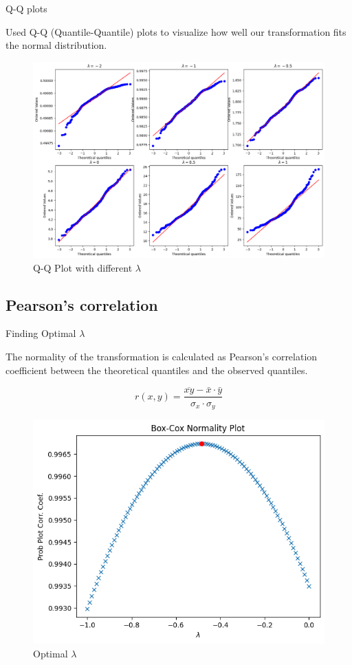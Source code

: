 \begin{frame}{Q-Q plots}

  Used Q-Q (Quantile-Quantile) plots to visualize how well our transformation fits the normal distribution.

  \vspace{0.25in}
  \begin{figure}
    \centering
    \includegraphics[width=0.8\linewidth]{../Report/images/q-q.png}
    \caption{Q-Q Plot with different $\lambda$}
  \end{figure}

\end{frame}


\subsection{Pearson's correlation}

\begin{frame}{Finding Optimal $\lambda$}

  The normality of the transformation is calculated as Pearson's correlation coefficient between the theoretical quantiles and the observed quantiles.

  \[ r(x, y) = \frac{\overline{xy} - \bar{x} \cdot \bar{y}}{\sigma_x \cdot \sigma_y} \]

  \vspace{0.25in}
  \begin{figure}
    \centering
    \includegraphics[width=0.6\linewidth]{../Report/images/normality.png}
    \caption{Optimal $\lambda$}
  \end{figure}
  
\end{frame}

